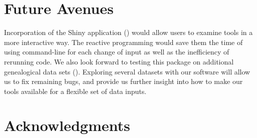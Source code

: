 \documentclass[article,shortnames]{jss}
\begin{document}
\section{Future Avenues}

Incorporation of the Shiny application (\citealt{shiny}) would allow users to examine  tools in a more interactive way. The reactive programming would save them the time of using command-line for each change of input as well as the inefficiency of rerunning code. We also look forward to testing this package on additional genealogical data sets (\citealt{mgp}). Exploring several datasets with our software will allow us to fix remaining bugs, and provide us further insight into how to make our tools available for a flexible set of data inputs.


\section*{Acknowledgments} %


\end{document}
